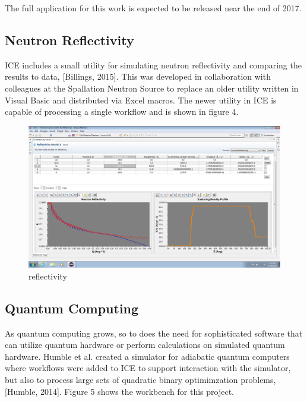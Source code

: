 The full application for this work is expected to be released near the
end of 2017.

\subsection{Neutron Reflectivity}\label{neutron-reflectivity}

ICE includes a small utility for simulating neutron reflectivity and
comparing the results to data, {[}Billings, 2015{]}. This was developed
in collaboration with colleagues at the Spallation Neutron Source to
replace an older utility written in Visual Basic and distributed via
Excel macros. The newer utility in ICE is capable of processing a single
workflow and is shown in figure 4.

\begin{figure}[htbp]
\centering
\includegraphics[width=\textwidth]{images/reflectivity-screenshot.png}
\caption{reflectivity}
\end{figure}

\subsection{Quantum Computing}\label{quantum-computing}

As quantum computing grows, so to does the need for sophisticated
software that can utilize quantum hardware or perform calculations on
simulated quantum hardware. Humble et al. created a simulator for
adiabatic quantum computers where workflows were added to ICE to support
interaction with the simulator, but also to process large sets of
quadratic binary optimimzation problems, {[}Humble, 2014{]}. Figure 5
shows the workbench for this project.


